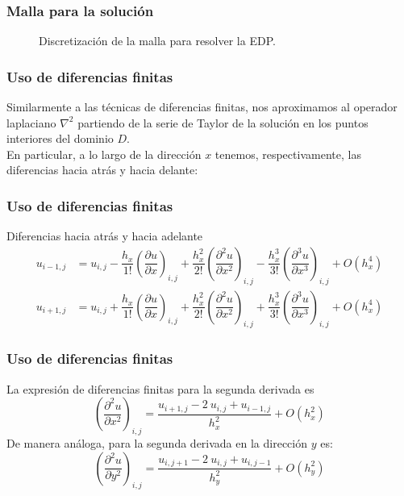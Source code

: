 \begin{frame}
\frametitle{Malla para la solución}
\captionsetup{font=small,labelfont=small}
\begin{figure}
	\centering
	
	\caption{Discretización de la malla para resolver la EDP.}
	\label{fig:figura_01}
\end{figure}
\end{frame}
\begin{frame}
\frametitle{Uso de diferencias finitas}
Similarmente a las técnicas de diferencias finitas, nos aproximamos al operador laplaciano $\nabla^{2}$ partiendo de la serie de Taylor de la solución en los puntos interiores del dominio $D$.
\\
\bigskip
En particular, a lo largo de la dirección $x$ tenemos, respectivamente, las diferencias hacia atrás y hacia delante:
\end{frame}
\begin{frame}
\frametitle{Uso de diferencias finitas}
Diferencias hacia atrás y hacia adelante
\fontsize{12}{12}\selectfont
\begin{align*}
u_{i-1, j} &= u_{i, j} - \dfrac{h_{x}}{1!} \left( \dfrac{\partial u}{\partial x} \right)_{i, j} + \dfrac{h_{x}^{2}}{2!} \left( \dfrac{\partial^{2} u}{\partial x^{2}} \right)_{i, j} - \dfrac{h_{x}^{3}}{3!} \left( \dfrac{\partial^{3} u}{\partial x^{3}} \right)_{i, j} + O(h_{x}^{4})  \\
u_{i+1, j} &= u_{i, j} + \dfrac{h_{x}}{1!} \left( \dfrac{\partial u}{\partial x} \right)_{i, j} + \dfrac{h_{x}^{2}}{2!} \left( \dfrac{\partial^{2} u}{\partial x^{2}} \right)_{i, j} + \dfrac{h_{x}^{3}}{3!} \left( \dfrac{\partial^{3} u}{\partial x^{3}} \right)_{i, j} + O(h_{x}^{4})
\end{align*}
\end{frame}
\begin{frame}
\frametitle{Uso de diferencias finitas}
La expresión de diferencias finitas para la segunda derivada es
\begin{equation}
\left( \dfrac{\partial^{2} u}{\partial x^{2}} \right)_{i,j} = \dfrac{u_{i+1, j} - 2 \: u_{i, j} + u_{i-1,j}}{h_{x}^{2}} + O(h_{x}^{2})
\label{eq:ecuacion_13_03}
\end{equation}
\pause
De manera análoga, para la segunda derivada en la dirección $y$ es:
\begin{equation}
\left( \dfrac{\partial^{2} u}{\partial y^{2}} \right)_{i,j} = \dfrac{u_{i, j+1} - 2 \: u_{i, j} + u_{i, j-1}}{h_{y}^{2}} + O(h_{y}^{2})
\label{eq:ecuacion_13_04}
\end{equation}
\end{frame}
